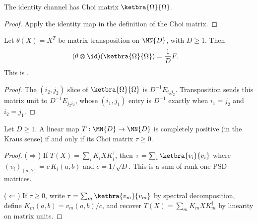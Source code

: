 \begin{theorem}\label{thm:choi_matrix_id}
    \leanok
    The identity channel has Choi matrix
    $\ketbra{\Omega}{\Omega}$.
\end{theorem}

\begin{proof}\leanok
    Apply the identity map in the definition of the Choi matrix.
\end{proof}

\begin{theorem}\label{thm:choi_transpose_flip}
    \leanok
    Let $\theta(X)=X^T$ be matrix transposition on $\MN{D}$, with $D \ge 1$.
    Then
    \begin{align}
        (\theta\otimes\id)(\ketbra{\Omega}{\Omega})
        &= \frac{1}{D}F.
        \label{eq:representations_transpose_choi}
    \end{align}
    This is \cite[Equation~3.1]{Wolf2012Quantum}.
\end{theorem}

\begin{proof}\leanok
    The $(i_2,j_2)$ slice of $\ketbra{\Omega}{\Omega}$ is
    $D^{-1}E_{i_2j_2}$. Transposition sends this matrix unit to
    $D^{-1}E_{j_2i_2}$, whose $(i_1,j_1)$ entry is $D^{-1}$ exactly when
    $i_1=j_2$ and $i_2=j_1$.
\end{proof}

\begin{theorem}\label{thm:cp_iff_choi_posSemidef}
    \leanok
    Let $D\geq1$. A linear map $T : \MN{D} \to \MN{D}$ is completely
    positive (in the Kraus sense) if and only if its Choi matrix $\tau \ge 0$.
\end{theorem}

\begin{proof}
    \leanok
    ($\Rightarrow$) If $T(X) = \sum_i K_i X K_i^\dagger$, then
    $\tau = \sum_i \ketbra{v_i}{v_i}$ where
    $(v_i)_{(a,b)} = c\,K_i(a,b)$ and $c = 1/\sqrt{D}$.
    This is a sum of rank-one PSD matrices.

    ($\Leftarrow$) If $\tau \ge 0$, write
    $\tau = \sum_m \ketbra{v_m}{v_m}$
    by spectral decomposition, define $K_m(a,b) = v_m(a,b)/c$,
    and recover $T(X) = \sum_m K_m X K_m^\dagger$ by linearity on
    matrix units.
\end{proof}

